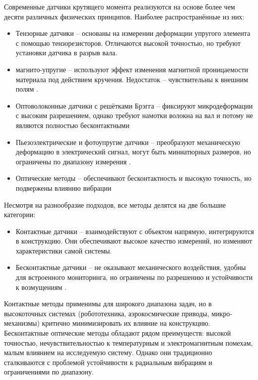 Современные датчики крутящего момента реализуются на основе более чем десяти различных физических принципов. Наиболее распространённые из них:
\begin{itemize}
	\item Тензорные датчики -- основаны на измерении деформации упругого элемента с помощью тензорезисторов. Отличаются высокой точностью, но требуют установки датчика в разрыв вала\cite{yeh2015digital,Hou2009,Mohammed2008,Chen2020}.
	\item магнито-упругие -- используют эффект изменения магнитной проницаемости материала под действием кручения. Недостаток -- чувствительны к внешним полям \cite{Shu2007}.
	\item Оптоволоконные датчики с решётками Брэгга -- фиксируют микродеформации с высоким разрешением, однако требуют намотки волокна на вал и потому не являются полностью бесконтактными \cite{Zhu2021}
	\item Пьезоэлектрические и фотоупругие датчики -- преобразуют механическую деформацию в электрический сигнал, могут быть миниатюрных размеров, но ограничены по диапазону измерения \cite{Bojtos2017,Hu2020}.
	\item Оптические методы -- обеспечивают бесконтактность и высокую точность, но подвержены влиянию вибрации \cite{Garinei2017,Sjodahl1996}
\end{itemize}
Несмотря на разнообразие подходов, все методы делятся на две большие категории:
\begin{itemize}
	\item Контактные датчики -- взаимодействуют с объектом напрямую, интегрируются в конструкцию. Они обеспечивают высокое качество измерений, но изменяют характеристики самой системы.
	\item Бесконтактные датчики -- не оказывают механического воздействия, удобны для встроенного мониторинга, но ограничены по разрешению и устойчивости к возмущениям \cite{Wang2021}. 	
\end{itemize} 

Контактные методы применимы для широкого диапазона задач, но в высокоточных системах (робототехника, аэрокосмические приводы, микро-механизмы) критично минимизировать их влияние на конструкцию. Бесконтактные оптические методы обладают рядом преимуществ: высокой точностью, нечувствительностью к температурным и электромагнитным помехам, малым влиянием на исследуемую систему. Однако они традиционно сталкиваются с проблемой устойчивости к радиальным вибрациям и ограничениями по диапазону.

